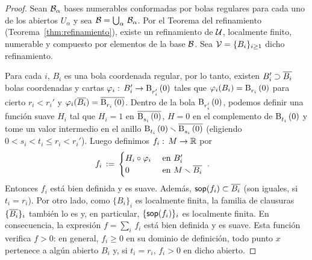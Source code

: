\begin{proof}
	Sean $\cal B_\alpha$ bases numerables conformadas por bolas regulares
	para cada uno de los abiertos $U_\alpha$ y sea
	$\cal B=\bigcup_\alpha\,\cal B_\alpha$. Por el Teorema del refinamiento
	(Teorema~\ref{thm:refinamiento}), existe un refinamiento de $\cal U$,
	localmente finito, numerable y compuesto por elementos de la base
	$\cal B$. Sea $\cal V=\{B_i\}_{i\geq 1}$ dicho refinamiento.

	Para cada $i$, $B_i$ es una bola coordenada regular, por lo tanto,
	existen $B_i'\supset\clos{B_i}$ bolas coordenadas y cartas
	$\varphi_i:\,B_i'\rightarrow\bola{r_i'}{0}$ tales que
	$\varphi_i(B_i)=\bola{r_i}{0}$ para cierto $r_i<r_i'$ y
	$\varphi_i(\clos{B_i})=\clos{\bola{r_i}{0}}$. Dentro de la bola
	$\bola{r_i'}{0}$, podemos definir una funci\'{o}n suave $H_i$ tal que
	$H_i=1$ en $\clos{\bola{s_i}{0}}$, $H=0$ en el complemento de
	$\bola{t_i}{0}$ y tome un valor intermedio en el anillo
	$\bola{t_i}{0}\setmin\clos{\bola{s_i}{0}}$ (eligiendo
	$0<s_i<t_i\leq r_i<r_i'$). Luego definimos $f_i:\,M\rightarrow\bb R$
	por
	\begin{align*}
		f_i & \,:=\,
			\begin{cases}
				H_i\circ\varphi_i & \text{ en } B_i' \\
				0 & \text{ en } M\setmin\clos{B_i}
			\end{cases}
		\text{ .}
	\end{align*}
	Entonces $f_i$ est\'{a} bien definida y es suave. Adem\'{a}s,
	$\soporte{f_i}\subset\clos{B_i}$ (son iguales, si $t_i=r_i$). Por otro
	lado, como $\{B_i\}_i$ es localmente finita, la familia de clausuras
	$\{\clos{B_i}\}_i$ tambi\'{e}n lo es y, en particular,
	$\{\soporte{f_i}\}_i$ es localmente finita. En consecuencia, la
	expresi\'{o}n $f=\sum_i\,f_i$ est\'{a} bien definida y es suave. Esta
	funci\'{o}n verifica $f>0$: en general, $f_i\geq 0$ en su dominio de
	definici\'{o}n, todo punto $x$ pertenece a alg\'{u}n abierto $B_i$ y,
	si $t_i=r_i$, $f_i>0$ en dicho abierto.


\end{proof}

